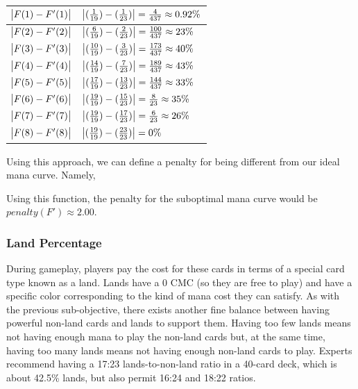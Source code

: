 \documentclass[12pt, letterpaper]{article}
\begin{document}
\begin{tabular}{|l|l|}
\hline

$ \abs{F(1) - F'(1)} $ & $ \abs{(\frac{1}{19}) - (\frac{1}{23})} = \frac{4}{437} \approx 0.92\% $ \\ \hline
$ \abs{F(2) - F'(2)} $ & $ \abs{(\frac{6}{19}) - (\frac{2}{23})} = \frac{100}{437} \approx 23\% $ \\ \hline
$ \abs{F(3) - F'(3)} $ & $ \abs{(\frac{10}{19}) - (\frac{3}{23})} = \frac{173}{437} \approx 40\% $ \\ \hline
$ \abs{F(4) - F'(4)} $ & $ \abs{(\frac{14}{19}) - (\frac{7}{23})} = \frac{189}{437} \approx 43\% $ \\ \hline
$ \abs{F(5) - F'(5)} $ & $ \abs{(\frac{17}{19}) - (\frac{13}{23})} = \frac{144}{437} \approx 33\% $ \\ \hline
$ \abs{F(6) - F'(6)} $ & $ \abs{(\frac{19}{19}) - (\frac{15}{23})} = \frac{8}{23} \approx 35\% $ \\ \hline
$ \abs{F(7) - F'(7)} $ & $ \abs{(\frac{19}{19}) - (\frac{17}{23})} = \frac{6}{23} \approx 26\% $ \\ \hline
$ \abs{F(8) - F'(8)} $ & $ \abs{(\frac{19}{19}) - (\frac{23}{23})} = 0\% $ \\ \hline

\end{tabular}

Using this approach,
we can define a penalty for being different from our ideal mana curve.
Namely,

Using this function, the penalty for the suboptimal mana curve would be
$ penalty(F') \approx 2.00 $.

\subsubsection{Land Percentage}
\label{objective:Land Percentage}

During gameplay,
players pay the cost for these cards in terms of a special card type known as a land.
Lands have a 0 CMC (so they are free to play)
and have a specific color corresponding to the kind of mana cost they can satisfy.
As with the previous sub-objective,
there exists another fine balance between having powerful non-land cards and lands to support them.
Having too few lands means not having enough mana to play the non-land cards
but, at the same time, having too many lands means not having enough non-land cards to play.
Experts recommend having a 17:23 lands-to-non-land ratio in a 40-card deck,
which is about 42.5\% lands,
but also permit 16:24 and 18:22 ratios.
\end{document}
